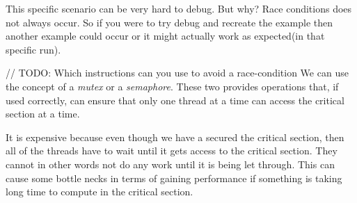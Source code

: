 \documentclass[11pt]{article}
\begin{document}
This specific scenario can be very hard to debug. But why? Race conditions does not always occur. So if you were to try debug and recreate the example then another example could occur or it might actually work as expected(in that specific run).

// TODO: Which instructions can you use to avoid a race-condition
We can use the concept of a \textit{mutex} or a \textit{semaphore}. These two provides operations that, if used correctly, can ensure that 
only one thread at a time can access the critical section at a time. 

It is expensive because even though we have a secured the critical section, then all of the threads have to wait until it gets access to
the critical section. They cannot in other words not do any work until it is being let through. This can cause some bottle necks in terms of 
gaining performance if something is taking long time to compute in the critical section.
\end{document}

